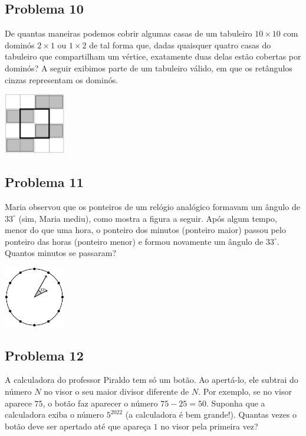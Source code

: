 \documentclass[12pt]{article}
\begin{document}
\clearpage

\subsection{Problema 10}
\begin{tcolorbox}[statementbox]
De quantas maneiras podemos cobrir algumas casas de um tabuleiro $10\times 10$ com dominós $2\times 1$ ou $1\times 2$ de tal forma que, dadas quaisquer quatro casas do tabuleiro que compartilham um vértice, exatamente duas delas estão cobertas por dominós? A seguir exibimos parte de um tabuleiro válido, em que os retângulos cinzas representam os dominós.
\begin{center}
  \includegraphics[width=0.2\textwidth]{third.png}
\end{center}
\end{tcolorbox}

\clearpage

\subsection{Problema 11}
\begin{tcolorbox}[statementbox]
Maria observou que os ponteiros de um relógio analógico formavam um ângulo de $33^\circ$ (sim, Maria mediu), como mostra a figura
a seguir. Após algum tempo, menor do que uma hora, o ponteiro dos minutos (ponteiro maior) passou pelo ponteiro das horas (ponteiro
menor) e formou novamente um ângulo de $33^\circ$. Quantos minutos se passaram? \\
\begin{center}
  \includegraphics[width=0.2\textwidth]{fourth.png}
\end{center}
\end{tcolorbox}

\clearpage

\subsection{Problema 12}
\begin{tcolorbox}[statementbox]
A calculadora do professor Piraldo tem só um botão. Ao apertá-lo, ele subtrai do número $N$ no visor o seu maior divisor diferente
de $N$. Por exemplo, se no visor aparece $75$, o botão faz aparecer o número $75-25=50$. Suponha que a calculadora exiba o número
$5^{2022}$ (a calculadora é bem grande!). Quantas vezes o botão deve ser apertado até que apareça $1$ no visor pela primeira vez?
\end{tcolorbox}
\end{document}
